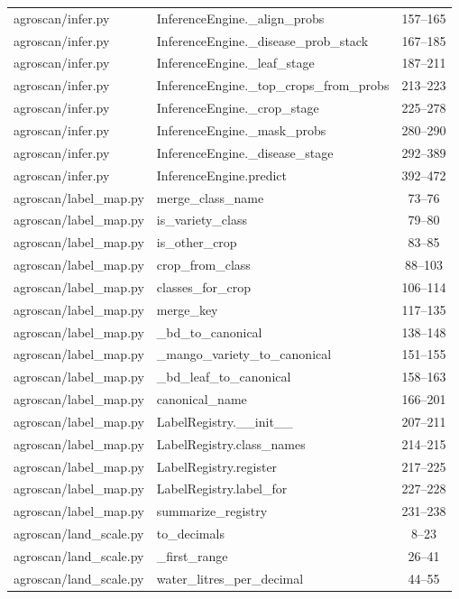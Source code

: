 \begin{center}
\begin{longtable}{@{}p{4.6cm}p{5.2cm}c@{}}
agroscan/infer.py & InferenceEngine.\_align\_probs & 157--165 \\
agroscan/infer.py & InferenceEngine.\_disease\_prob\_stack & 167--185 \\
agroscan/infer.py & InferenceEngine.\_leaf\_stage & 187--211 \\
agroscan/infer.py & InferenceEngine.\_top\_crops\_from\_probs & 213--223 \\
agroscan/infer.py & InferenceEngine.\_crop\_stage & 225--278 \\
agroscan/infer.py & InferenceEngine.\_mask\_probs & 280--290 \\
agroscan/infer.py & InferenceEngine.\_disease\_stage & 292--389 \\
agroscan/infer.py & InferenceEngine.predict & 392--472 \\
agroscan/label\_map.py & merge\_class\_name & 73--76 \\
agroscan/label\_map.py & is\_variety\_class & 79--80 \\
agroscan/label\_map.py & is\_other\_crop & 83--85 \\
agroscan/label\_map.py & crop\_from\_class & 88--103 \\
agroscan/label\_map.py & classes\_for\_crop & 106--114 \\
agroscan/label\_map.py & merge\_key & 117--135 \\
agroscan/label\_map.py & \_bd\_to\_canonical & 138--148 \\
agroscan/label\_map.py & \_mango\_variety\_to\_canonical & 151--155 \\
agroscan/label\_map.py & \_bd\_leaf\_to\_canonical & 158--163 \\
agroscan/label\_map.py & canonical\_name & 166--201 \\
agroscan/label\_map.py & LabelRegistry.\_\_init\_\_ & 207--211 \\
agroscan/label\_map.py & LabelRegistry.class\_names & 214--215 \\
agroscan/label\_map.py & LabelRegistry.register & 217--225 \\
agroscan/label\_map.py & LabelRegistry.label\_for & 227--228 \\
agroscan/label\_map.py & summarize\_registry & 231--238 \\
agroscan/land\_scale.py & to\_decimals & 8--23 \\
agroscan/land\_scale.py & \_first\_range & 26--41 \\
agroscan/land\_scale.py & water\_litres\_per\_decimal & 44--55 \\

\end{longtable}
\end{center}
